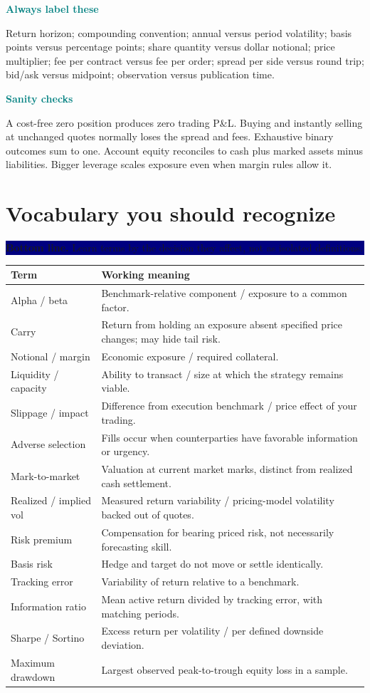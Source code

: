\documentclass[10pt,letterpaper]{article}
\newcommand{\bl}[1]{\noindent\colorbox{navy}{\parbox{\dimexpr\linewidth-2\fboxsep}{\color{white}\textbf{Bottom line.} #1}}\par\medskip}
\newcommand{\topic}[2]{\clearpage\section{#1}\bl{#2}}
\newcommand{\sub}[1]{\par\textbf{\textcolor{teal}{#1}}\par}
\begin{document}
\sub{Always label these}
Return horizon; compounding convention; annual versus period volatility; basis points versus percentage points; share quantity versus dollar notional; price multiplier; fee per contract versus fee per order; spread per side versus round trip; bid/ask versus midpoint; observation versus publication time.
\sub{Sanity checks}
A cost-free zero position produces zero trading P\&L. Buying and instantly selling at unchanged quotes normally loses the spread and fees. Exhaustive binary outcomes sum to one. Account equity reconciles to cash plus marked assets minus liabilities. Bigger leverage scales exposure even when margin rules allow it.
\topic{Vocabulary you should recognize}{Learn terms by the decision they affect, not as isolated definitions.}
\small
\begin{tabularx}{\linewidth}{@{}lX@{}}\toprule
Term & Working meaning\\\midrule
Alpha / beta & Benchmark-relative component / exposure to a common factor.\\
Carry & Return from holding an exposure absent specified price changes; may hide tail risk.\\
Notional / margin & Economic exposure / required collateral.\\
Liquidity / capacity & Ability to transact / size at which the strategy remains viable.\\
Slippage / impact & Difference from execution benchmark / price effect of your trading.\\
Adverse selection & Fills occur when counterparties have favorable information or urgency.\\
Mark-to-market & Valuation at current market marks, distinct from realized cash settlement.\\
Realized / implied vol & Measured return variability / pricing-model volatility backed out of quotes.\\
Risk premium & Compensation for bearing priced risk, not necessarily forecasting skill.\\
Basis risk & Hedge and target do not move or settle identically.\\
Tracking error & Variability of return relative to a benchmark.\\
Information ratio & Mean active return divided by tracking error, with matching periods.\\
Sharpe / Sortino & Excess return per volatility / per defined downside deviation.\\
Maximum drawdown & Largest observed peak-to-trough equity loss in a sample.\\

\end{tabularx}
\end{document}
